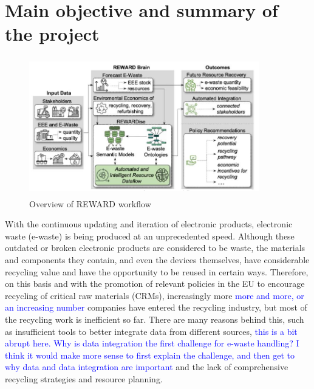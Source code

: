 \documentclass{article}
\newcommand{\MGcomment}[1]{\textcolor{blue}{#1}}
\numberwithin{equation}{section}
\begin{document}
\section{Main objective and summary of the project}
\begin{figure}[h]
\centering
\includegraphics[height=6cm,width=10cm]{overview.png}
\caption{Overview of REWARD workflow} \label{fig:overview}
\end{figure}
With the continuous updating and iteration of electronic products, electronic waste (e-waste) is being produced at an unprecedented speed. Although these outdated or broken electronic products are considered to be waste, the materials and components they contain, and even the devices themselves, have considerable recycling value and have the opportunity to be reused in certain ways. Therefore, on this basis and with the promotion of relevant policies in the EU to encourage recycling of critical raw materials (CRMs), increasingly more \MGcomment{more and more, or an increasing number} companies have entered the recycling industry, but most of the recycling work is inefficient so far. There are many reasons behind this, such as insufficient tools to better integrate data from different sources, \MGcomment{this is a bit abrupt here.  Why is data integration the first challenge for e-waste handling?  I think it would make more sense to first explain the challenge, and then get to why data and data integration are important} and the lack of comprehensive recycling strategies and resource planning.
\end{document}
